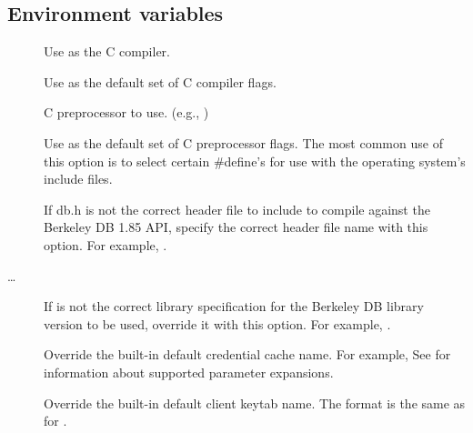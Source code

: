 \documentclass[letterpaper,10pt,english]{sphinxmanual}
\begin{document}
\subsection{Environment variables}
\label{\detokenize{build/options2configure:environment-variables}}\begin{description}
\item[{}] \leavevmode
Use  as the C compiler.

\item[{}] \leavevmode
Use  as the default set of C compiler flags.

\item[{}] \leavevmode
C preprocessor to use. (e.g., )

\item[{}] \leavevmode
Use  as the default set of C preprocessor flags.  The
most common use of this option is to select certain \#define’s for
use with the operating system’s include files.

\item[{}] \leavevmode
If db.h is not the correct header file to include to compile
against the Berkeley DB 1.85 API, specify the correct header file
name with this option. For example, .

\item[{…}] \leavevmode
If  is not the correct library specification for the
Berkeley DB library version to be used, override it with this
option. For example, .

\item[{}] \leavevmode
Override the built-in default credential cache name.
For example, 
See  for information about supported
parameter expansions.

\item[{}] \leavevmode
Override the built-in default client keytab name.
The format is the same as for .


\end{description}
\end{document}
